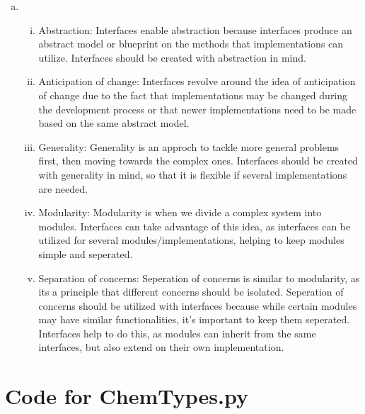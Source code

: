 \documentclass[12pt]{article}
\begin{document}
\begin{enumerate}[a)]
\item
  \begin{enumerate}[i)]
\item Abstraction:
Interfaces enable abstraction because interfaces produce an abstract model or blueprint on the methods that implementations can utilize. Interfaces should be created with abstraction in mind. 
\item Anticipation of change:
Interfaces revolve around the idea of anticipation of change due to the fact that implementations may be changed during the development process or that newer implementations need to be made based on the same abstract model. 
\item Generality:
Generality is an approch to tackle more general problems first, then moving towards the complex ones. Interfaces should be created with generality in mind, so that it is flexible if several implementations are needed.
\item Modularity:
Modularity is when we divide a complex system into modules. Interfaces can take advantage of this idea, as interfaces can be utilized for several modules/implementations, helping to keep modules simple and seperated.  
\item Separation of concerns:
Seperation of concerns is similar to modularity, as its a principle that different concerns should be isolated. Seperation of concerns should be utilized with interfaces because while certain modules may have similar functionalities, it's important to keep them seperated. Interfaces help to do this, as modules can inherit from the same interfaces, but also extend on their own implementation.

\end{enumerate}

\end{enumerate}

\newpage

\lstset{language=Python, basicstyle=\tiny, breaklines=true, showspaces=false,
  showstringspaces=false, breakatwhitespace=true}

\def\thesection{\Alph{section}}

\section{Code for ChemTypes.py}

\noindent 

\newpage
\end{document}
